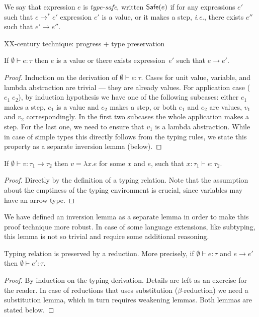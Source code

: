 \begin{defin}
  We say that expression $e$ is \emph{type-safe}, written $\mathsf{Safe}(e)$
  if for any expressions $e'$ such that $e \longrightarrow^* e'$
  expression $e'$ is a value, or it makes a step, \emph{i.e.},
  there exists $e''$ such that $e' \longrightarrow e''$.
\end{defin}

XX-century technique: progress + type preservation

\begin{theorem}[Progress]
  If $\emptyset\vdash e : \tau$ then
  $e$ is a value or there exists expression~$e'$
  such that $e \longrightarrow e'$.
\end{theorem}
\begin{proof}
  Induction on the derivation of $\emptyset\vdash e : \tau$.
  Cases for unit value, variable, and lambda abstraction are trivial ---
  they are already values.
  For application case ($e_1\;e_2$), by induction hypothesis we have one
  of the following subcases: either $e_1$ makes a step,
  $e_1$ is a value and $e_2$ makes a step,
  or both $e_1$ and $e_2$ are values, $v_1$ and $v_2$ correspondingly.
  In the first two subcases the whole application makes a step.
  For the last one, we need to ensure that $v_1$ is a lambda abstraction.
  While in case of simple types this directly follows from the typing rules,
  we state this property as a separate inversion lemma (below).
\end{proof}

\begin{lemma}
  If $\emptyset\vdash v : \tau_1 \to \tau_2$
  then $v = \lambda x.e$ for some $x$ and $e$,
  such that $x:\tau_1 \vdash e : \tau_2$.
\end{lemma}
\begin{proof}
  Directly by the definition of a typing relation.
  Note that the assumption about the emptiness of the typing environment
  is crucial, since variables may have an arrow type.
\end{proof}

We have defined an inversion lemma as a separate lemma in order
to make this proof technique more robust.
In case of some language extensions, like subtyping,
this lemma is not so trivial and require some additional reasoning.

\begin{theorem}
  Typing relation is preserved by a reduction.
  More precisely, if $\emptyset \vdash e : \tau$ and $e \longrightarrow e'$ then
  $\emptyset \vdash e' : \tau$.
\end{theorem}
\begin{proof}
  By induction on the typing derivation.
  Details are left as an exercise for the reader.
  In case of reductions that uses substitution ($\beta$-reduction)
  we need a substitution lemma, which in turn requires weakening lemmas.
  Both lemmas are stated below.
\end{proof}

